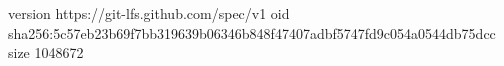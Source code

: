 version https://git-lfs.github.com/spec/v1
oid sha256:5c57eb23b69f7bb319639b06346b848f47407adbf5747fd9c054a0544db75dcc
size 1048672
